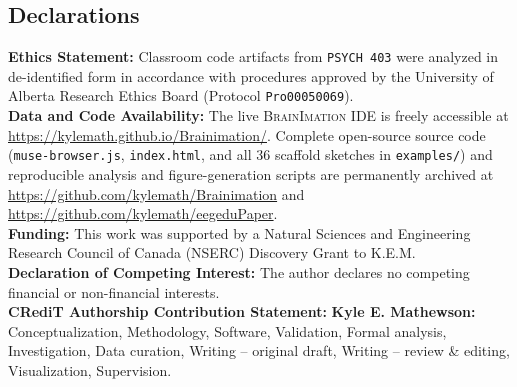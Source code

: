 \documentclass[10pt,twocolumn]{article}
\begin{document}
\subsection*{Declarations}
\noindent\textbf{Ethics Statement:} Classroom code artifacts from \texttt{PSYCH 403} were analyzed in de-identified form in accordance with procedures approved by the University of Alberta Research Ethics Board (Protocol \texttt{Pro00050069}).\\[2pt]
\noindent\textbf{Data and Code Availability:} The live \textsc{BrainImation} IDE is freely accessible at \url{https://kylemath.github.io/Brainimation/}. Complete open-source source code (\texttt{muse-browser.js}, \texttt{index.html}, and all 36 scaffold sketches in \texttt{examples/}) and reproducible analysis and figure-generation scripts are permanently archived at \url{https://github.com/kylemath/Brainimation} and \url{https://github.com/kylemath/eegeduPaper}.\\[2pt]
\noindent\textbf{Funding:} This work was supported by a Natural Sciences and Engineering Research Council of Canada (NSERC) Discovery Grant to K.E.M.\\[2pt]
\noindent\textbf{Declaration of Competing Interest:} The author declares no competing financial or non-financial interests.\\[2pt]
\noindent\textbf{CRediT Authorship Contribution Statement:} \textbf{Kyle E. Mathewson:} Conceptualization, Methodology, Software, Validation, Formal analysis, Investigation, Data curation, Writing -- original draft, Writing -- review \& editing, Visualization, Supervision.



\end{document}
